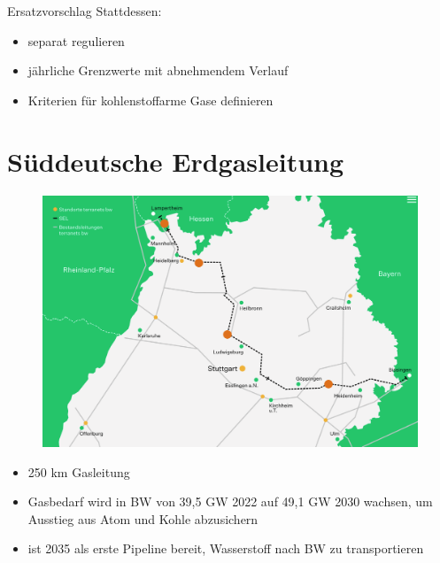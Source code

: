 \documentclass[10pt]{beamer}
\begin{document}
\begin{frame}{Ersatzvorschlag}
  Stattdessen:
  \begin{itemize}
    \item separat regulieren
    \item jährliche Grenzwerte mit abnehmendem Verlauf
    \item Kriterien für kohlenstoffarme Gase definieren
  \end{itemize}
\end{frame}

\section{Süddeutsche Erdgasleitung}


\begin{frame}
\begin{figure}
\includegraphics[width=\textwidth]{fig/sel.png}

\scriptsize{}
\end{figure}
\end{frame}

\begin{frame}
  \begin{itemize}
    \item 250 km Gasleitung
    \item Gasbedarf wird in BW von 39,5 GW 2022 auf 49,1 GW 2030 wachsen, um Ausstieg aus Atom und Kohle abzusichern
    \item ist 2035 als erste Pipeline bereit, Wasserstoff nach BW zu transportieren
  \end{itemize}

  \centering
\end{frame}
\end{document}

